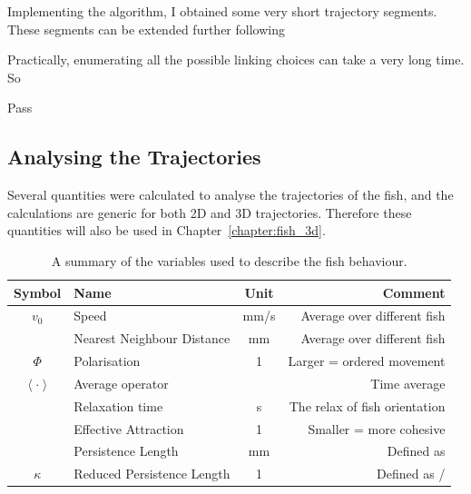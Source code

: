 \documentclass[11pt,twoside]{report}
\begin{document}
Implementing the algorithm, I obtained some very short trajectory segments. These segments can be extended further following


Practically, enumerating all the possible linking choices can take a very long time. So


Pass



\subsection{Analysing the Trajectories}

Several quantities were calculated to analyse the trajectories of the fish, and the calculations are generic for both 2D and 3D trajectories. Therefore these quantities will also be used in Chapter~\ref{chapter:fish_3d}.

\begin{table}
	\begin{minipage}[b]{\linewidth}
	\centering
		\begin{tabular}{c l c r}
			\toprule
		    Symbol & Name & Unit & Comment \\
		    \midrule
		    $v_0$ & Speed & mm/s & Average over different fish\\
		    {\dnn} & Nearest Neighbour Distance & mm & Average over different fish\\
		    $\Phi$ & Polarisation &  1 & Larger = ordered movement\\
		    $\left\langle \cdot \right\rangle$ & Average operator  & &  Time average\\
		    {\mtau} & Relaxation time & s & The relax of fish orientation \\
		    {\meps} & Effective Attraction & 1 & Smaller = more cohesive\\
		    {\mlp} & Persistence Length & mm & Defined as {\mspd}{\mtau} \\
		    $\kappa$ & Reduced Persistence Length & 1 & Defined as {\mlp} / {\mdnn} \\
		    \bottomrule
		\end{tabular}
	\end{minipage}
	\label{tab:behaviour-quantities}
	\caption{A summary of the variables used to describe the fish behaviour.}
  \label{table:geometry}
\end{table}
\end{document}
